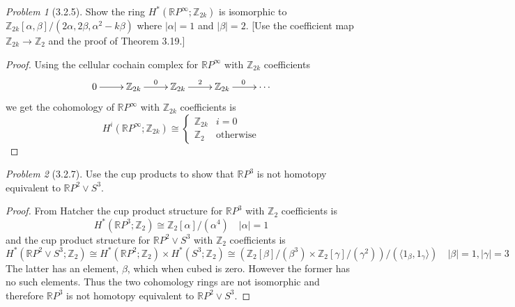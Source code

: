 \documentclass[10pt]{article}
\newcommand{\sk}{\vskip 10mm}
\newcommand{\bb}[1]{\mathbb{#1}}
\theoremstyle{remark}
\newtheorem{problem}{Problem}
\begin{document}
\sk

\begin{problem}[3.2.5]
  Show the ring $H^*(\bb{R}P^\infty;\bb{Z}_{2k})$ is isomorphic to
  $\bb{Z}_{2k}[\alpha,\beta]/(2\alpha,2\beta,\alpha^2-k\beta)$ where
  $|\alpha|=1$ and $|\beta|=2$. [Use the coefficient map
  $\bb{Z}_{2k}\rightarrow\bb{Z}_2$ and the proof of Theorem 3.19.]
\end{problem}

\begin{proof}
  Using the cellular cochain complex for $\bb{R}P^\infty$ with $\bb{Z}_{2k}$
  coefficients
  \[
    \xymatrix{
      0 \ar[r] & \bb{Z}_{2k} \ar[r]^0 & \bb{Z}_{2k} \ar[r]^2 & \bb{Z}_{2k} \ar[r]^0 & \cdots
    }
  \]
  we get the cohomology of $\bb{R}P^\infty$ with $\bb{Z}_{2k}$ coefficients is
  \[
    H^i(\bb{R}P^\infty;\bb{Z}_{2k})\cong 
    \left\{
      \begin{array}{ll}
        \bb{Z}_{2k}& i=0\\
        \bb{Z}_{2} & \text{otherwise}
      \end{array}
    \right.
  \]
\end{proof}

\sk

\begin{problem}[3.2.7]
  Use the cup products to show that $\bb{R}P^3$ is  not homotopy equivalent to
  $\bb{R}P^2\vee S^3$.
\end{problem}

\begin{proof}
  From Hatcher the cup product structure for $\bb{R}P^3$ with $\bb{Z}_2$ coefficients
  is
  \[
    H^*(\bb{R}P^3;\bb{Z}_2)\cong \bb{Z}_2[\alpha]/(\alpha^4)\quad |\alpha|=1
  \]
  and the cup product structure for $\bb{R}P^2\vee S^3$ with $\bb{Z}_2$ coefficients is
  \[
    H^*(\bb{R}P^2\vee S^3;\bb{Z}_2)\cong H^*(\bb{R}P^2;\bb{Z}_2)\times H^*(S^3;\bb{Z}_2)
    \cong(\bb{Z}_2[\beta]/(\beta^3)\times\bb{Z}_2[\gamma]/(\gamma^2))/(\langle 1_\beta,1_\gamma\rangle)\quad |\beta|=1,|\gamma|=3
  \]
  The latter has an element, $\beta$, which when cubed is zero. However the former
  has no such elements. Thus the two cohomology rings are not isomorphic
  and therefore $\bb{R}P^3$ is not homotopy equivalent to $\bb{R}P^2\vee S^3$.
\end{proof}
\end{document}
